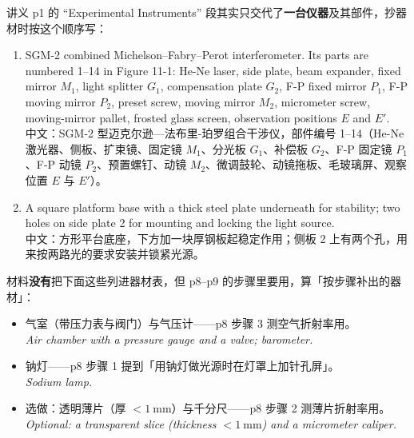 \documentclass[11pt]{ctexart}
\begin{document}

讲义 p1 的 ``Experimental Instruments'' 段其实只交代了\textbf{一台仪器}及其部件，抄器材时按这个顺序写：

\begin{enumerate}
\item SGM-2 combined Michelson--Fabry--Perot interferometer. Its parts are numbered 1--14 in Figure 11-1: He-Ne laser, side plate, beam expander, fixed mirror \(M_1\), light splitter \(G_1\), compensation plate \(G_2\), F-P fixed mirror \(P_1\), F-P moving mirror \(P_2\), preset screw, moving mirror \(M_2\), micrometer screw, moving-mirror pallet, frosted glass screen, observation positions \(E\) and \(E'\).\\
中文：SGM-2 型迈克尔逊—法布里-珀罗组合干涉仪，部件编号 1--14（He-Ne 激光器、侧板、扩束镜、固定镜 \(M_1\)、分光板 \(G_1\)、补偿板 \(G_2\)、F-P 固定镜 \(P_1\)、F-P 动镜 \(P_2\)、预置螺钉、动镜 \(M_2\)、微调鼓轮、动镜拖板、毛玻璃屏、观察位置 \(E\) 与 \(E'\)）。
\item A square platform base with a thick steel plate underneath for stability; two holes on side plate 2 for mounting and locking the light source.\\
中文：方形平台底座，下方加一块厚钢板起稳定作用；侧板 2 上有两个孔，用来按两路光的要求安装并锁紧光源。
\end{enumerate}

材料\textbf{没有}把下面这些列进器材表，但 p8--p9 的步骤里要用，算「按步骤补出的器材」：

\begin{itemize}
\item 气室（带压力表与阀门）与气压计——p8 步骤 3 测空气折射率用。\\
\textit{Air chamber with a pressure gauge and a valve; barometer.}
\item 钠灯——p8 步骤 1 提到「用钠灯做光源时在灯罩上加针孔屏」。\\
\textit{Sodium lamp.}
\item 选做：透明薄片（厚 \(<1\ \mathrm{mm}\)）与千分尺——p8 步骤 2 测薄片折射率用。\\
\textit{Optional: a transparent slice (thickness \(<1\ \mathrm{mm}\)) and a micrometer caliper.}
\end{itemize}

\end{document}
